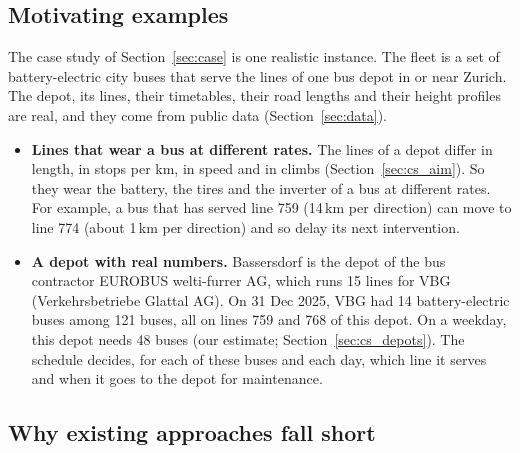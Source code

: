 \documentclass[11pt,a4paper]{article}
\theoremstyle{plain}
\theoremstyle{definition}
\theoremstyle{remark}
\begin{document}
\subsection{Motivating examples}

The case study of Section~\ref{sec:case} is one realistic instance.
The fleet is a set of battery-electric city buses that serve the lines of one bus depot in or near Zurich.
The depot, its lines, their timetables, their road lengths and their height profiles are real, and they come from public data (Section~\ref{sec:data}).

\begin{itemize}
  \item \textbf{Lines that wear a bus at different rates.}
    The lines of a depot differ in length, in stops per km, in speed and in climbs (Section~\ref{sec:cs_aim}).
    So they wear the battery, the tires and the inverter of a bus at different rates.
    For example, a bus that has served line 759 (14\,km per direction) can move to line 774 (about 1\,km per direction) and so delay its next intervention.
  \item \textbf{A depot with real numbers.}
    Bassersdorf is the depot of the bus contractor EUROBUS welti-furrer AG, which runs 15 lines for VBG (Verkehrsbetriebe Glattal AG)\cite{VBG2026Partner}.
    On 31 Dec 2025, VBG had 14 battery-electric buses among 121 buses, all on lines 759 and 768 of this depot\cite[p.~4]{VBG2026Report}\cite{VBG2026Fleet}.
    On a weekday, this depot needs 48 buses (our estimate; Section~\ref{sec:cs_depots}).
    The schedule decides, for each of these buses and each day, which line it serves and when it goes to the depot for maintenance.
\end{itemize}

\subsection{Why existing approaches fall short}
\end{document}
